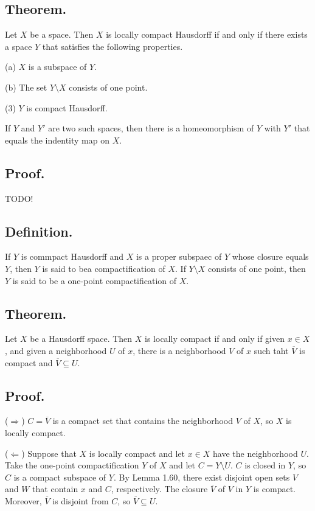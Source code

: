 \documentclass[titlepage]{article}
\begin{document}
\subsection{Theorem.} Let $X$ be a space. Then $X$ is locally compact Hausdorff if and only if there exists a space $Y$ that satisfies the following properties.

(a) $X$ is a subspace of $Y$.

(b) The set $Y \setminus X$ consists of one point.

(3) $Y$ is compact Hausdorff.

If $Y$ and $Y'$ are two such spaces, then there is a homeomorphism of $Y$ with $Y'$ that equals the indentity map on $X$.

\subsection{Proof.} TODO!

\subsection{Definition.} If $Y$ is commpact Hausdorff and $X$ is a proper subspaec of $Y$ whose closure equals $Y$, then $Y$ is said to bea compactification of $X$. If $Y \setminus X$ consists of one point, then $Y$ is said to be a one-point compactification of $X$.

\subsection{Theorem.} Let $X$ be a Hausdorff space. Then $X$ is locally compact if and only if given $x \in X$, and given a neighborhood $U$ of $x$, there is a neighborhood $V$ of $x$ such taht $\overline{V}$ is compact and $\overline{V} \subseteq U$.

\subsection{Proof.}

($\Rightarrow$) $C = \overline{V}$ is a compact set that contains the neighborhood $V$ of $X$, so $X$ is locally compact.

($\Leftarrow$) Suppose that $X$ is locally compact and let $x \in X$ have the neighborhood $U$. Take the one-point compactification $Y$ of $X$ and let $C = Y \setminus U$. $C$ is closed in $Y$, so $C$ is a compact subspace of $Y$. By Lemma 1.60, there exist disjoint open sets $V$ and $W$ that contain $x$ and $C$, respectively. The closure $\overline{V}$ of $V$ in $Y$ is compact. Moreover, $\overline{V}$ is disjoint from $C$, so $\overline{V} \subseteq U$.
\end{document}

